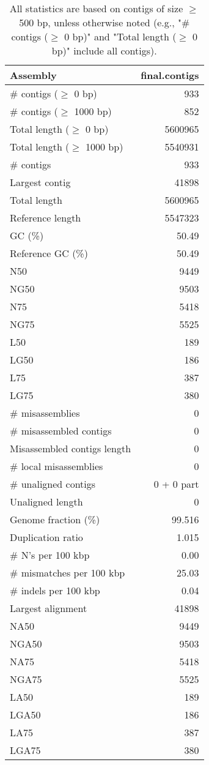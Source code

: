 \documentclass[12pt,a4paper]{article}
\begin{document}
\begin{table}[ht]
\begin{center}
\caption{All statistics are based on contigs of size $\geq$ 500 bp, unless otherwise noted (e.g., "\# contigs ($\geq$ 0 bp)" and "Total length ($\geq$ 0 bp)" include all contigs).}
\begin{tabular}{|l*{1}{|r}|}
\hline
Assembly & final.contigs \\ \hline
\# contigs ($\geq$ 0 bp) & 933 \\ \hline
\# contigs ($\geq$ 1000 bp) & 852 \\ \hline
Total length ($\geq$ 0 bp) & 5600965 \\ \hline
Total length ($\geq$ 1000 bp) & 5540931 \\ \hline
\# contigs & 933 \\ \hline
Largest contig & 41898 \\ \hline
Total length & 5600965 \\ \hline
Reference length & 5547323 \\ \hline
GC (\%) & 50.49 \\ \hline
Reference GC (\%) & 50.49 \\ \hline
N50 & 9449 \\ \hline
NG50 & 9503 \\ \hline
N75 & 5418 \\ \hline
NG75 & 5525 \\ \hline
L50 & 189 \\ \hline
LG50 & 186 \\ \hline
L75 & 387 \\ \hline
LG75 & 380 \\ \hline
\# misassemblies & 0 \\ \hline
\# misassembled contigs & 0 \\ \hline
Misassembled contigs length & 0 \\ \hline
\# local misassemblies & 0 \\ \hline
\# unaligned contigs & 0 + 0 part \\ \hline
Unaligned length & 0 \\ \hline
Genome fraction (\%) & 99.516 \\ \hline
Duplication ratio & 1.015 \\ \hline
\# N's per 100 kbp & 0.00 \\ \hline
\# mismatches per 100 kbp & 25.03 \\ \hline
\# indels per 100 kbp & 0.04 \\ \hline
Largest alignment & 41898 \\ \hline
NA50 & 9449 \\ \hline
NGA50 & 9503 \\ \hline
NA75 & 5418 \\ \hline
NGA75 & 5525 \\ \hline
LA50 & 189 \\ \hline
LGA50 & 186 \\ \hline
LA75 & 387 \\ \hline
LGA75 & 380 \\ \hline
\end{tabular}
\end{center}
\end{table}
\end{document}
